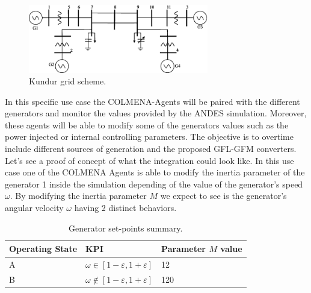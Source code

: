 \documentclass{article}
\begin{document}
\begin{figure}[!htb]
    \centering
    \includegraphics[width=0.7\textwidth]{pictures/kundurgrid.png}
    \caption{Kundur grid scheme. \cite{grids:kundur}}
    \label{fig:kundur2}
\end{figure}

In this specific use case the COLMENA-Agents will be paired with the different generators and monitor the values provided by the ANDES simulation. Moreover, these agents will be able to modify some of the generators values such as the power injected or internal controlling parameters. The objective is to overtime include different sources of generation and the proposed GFL-GFM converters. Let's see a proof of concept of what the integration could look like. In this use case one of the COLMENA Agents is able to modify the inertia parameter of the generator 1 inside the simulation depending of the value of the generator's speed $\omega$. By modifying the inertia parameter $M$ we expect to see is the generator's angular velocity $\omega$ having 2 distinct behaviors.  

\begin{table}[H]
    \centering
    \begin{tabular}{|l|l|l|}
    \hline
    Operating State & KPI                              & Parameter $M$ value \\ \hline
    A               & $\omega \in [1 - \varepsilon, 1 + \varepsilon]$ & 12  \\ \hline
    B               & $\omega \notin [1 - \varepsilon, 1 + \varepsilon]$ & 120               \\ \hline
    \end{tabular}
    \caption{Generator set-points summary.}
\end{table}
  
\end{document}
